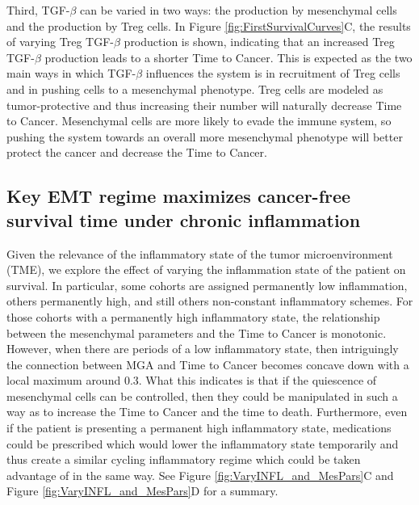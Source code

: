 \documentclass{article}
\begin{document}
Third, TGF-$\beta$ can be varied in two ways: the production by mesenchymal cells and the production by Treg cells.
In Figure \ref{fig:FirstSurvivalCurves}C, the results of varying Treg TGF-$\beta$ production is shown, indicating that an increased Treg TGF-$\beta$ production leads to a shorter Time to Cancer.
This is expected as the two main ways in which TGF-$\beta$ influences the system is in recruitment of Treg cells and in pushing cells to a mesenchymal phenotype.
Treg cells are modeled as tumor-protective and thus increasing their number will naturally decrease Time to Cancer.
Mesenchymal cells are more likely to evade the immune system, so pushing the system towards an overall more mesenchymal phenotype will better protect the cancer and decrease the Time to Cancer.

\subsection{Key EMT regime maximizes cancer-free survival time under chronic inflammation}\label{KeyEMT}
Given the relevance of the inflammatory state of the tumor microenvironment (TME), we explore the effect of varying the inflammation state of the patient on survival.
In particular, some cohorts are assigned permanently low inflammation, others permanently high, and still others non-constant inflammatory schemes.
For those cohorts with a permanently high inflammatory state, the relationship between the mesenchymal parameters and the Time to Cancer is monotonic.
However, when there are periods of a low inflammatory state, then intriguingly the connection between MGA and Time to Cancer becomes concave down with a local maximum around 0.3.
What this indicates is that if the quiescence of mesenchymal cells can be controlled, then they could be manipulated in such a way as to increase the Time to Cancer and the time to death.
Furthermore, even if the patient is presenting a permanent high inflammatory state, medications could be prescribed which would lower the inflammatory state temporarily and thus create a similar cycling inflammatory regime which could be taken advantage of in the same way.
See Figure \ref{fig:VaryINFL_and_MesPars}C and Figure \ref{fig:VaryINFL_and_MesPars}D for a summary.
\end{document}
